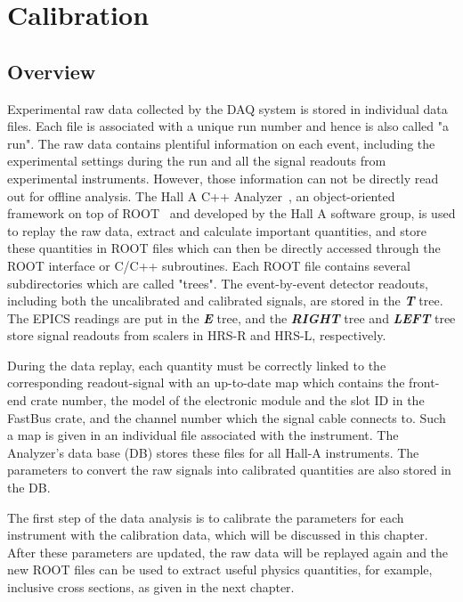 \chapter{Calibration}

\section{Overview}
 Experimental raw data collected by the DAQ system is stored in individual data files. Each file is associated with a unique run number and hence is also called "a run". The raw data contains plentiful information on each event, including the experimental settings during the run and all the signal readouts from experimental instruments. However, those information can not be directly read out for offline analysis. The Hall A C++ Analyzer~\cite{analyzer}, an object-oriented framework on top of ROOT~\cite{cern_root} and developed by the Hall A software group, is used to replay the raw data, extract and calculate important quantities, and store these quantities in ROOT files which can then be directly accessed through the ROOT interface or C/C++ subroutines. Each ROOT file contains several subdirectories which are called  "trees". The event-by-event detector readouts, including both the uncalibrated and calibrated signals, are stored in the \emph{\bf{T}} tree. The EPICS readings are put in the \emph{\bf{E}} tree, and the \emph{\bf{RIGHT}} tree and \emph{\bf{LEFT}} tree store signal readouts from scalers in HRS-R and HRS-L, respectively.
 
   During the data replay, each quantity must be correctly linked to the corresponding readout-signal with an up-to-date map which contains the front-end crate number, the model of the electronic module and the slot ID in the FastBus crate, and the channel number which the signal cable connects to. Such a map is given in an individual file associated with the instrument. The Analyzer's data base (DB) stores these files for all Hall-A instruments. The parameters to convert the raw signals into calibrated quantities are also stored in the DB.  
   
  The first step of the data analysis is to calibrate the parameters for each instrument with the calibration data, which will be discussed in this chapter. After these parameters are updated, the raw data will be replayed again and the new ROOT files can be used to extract useful physics quantities, for example, inclusive cross sections, as given in the next chapter. 
  
